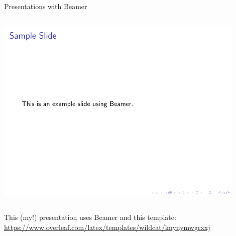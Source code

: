 \documentclass[aspectratio=1610]{beamer}
\begin{document}
\begin{frame}[fragile]{Presentations with Beamer}
 \begin{columns}[T]


      



      \includegraphics[width=0.9\textwidth, frame]{example_beamer.pdf}

  \end{columns}
\vfill
This (my!) presentation uses Beamer and this template:
\url{https://www.overleaf.com/latex/templates/wildcat/knynymwgrxxj}
\end{frame}
\end{document}
